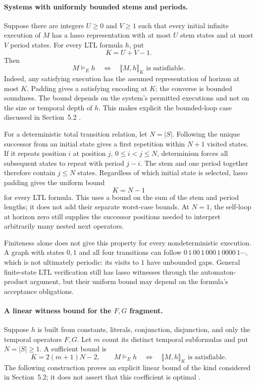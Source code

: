 \paragraph{Systems with uniformly bounded stems and periods.}
Suppose there are integers \(U\geq0\) and \(V\geq1\) such that
every initial infinite execution of \(M\) has a lasso
representation with at most \(U\) stem states and at most
\(V\) period states. For every LTL formula \(h\), put
\[
 K=U+V-1.
\]
Then
\[
 M\models_E h
 \quad\Longleftrightarrow\quad
 \llbracket M,h\rrbracket_K\text{ is satisfiable}.
\]
Indeed, any satisfying execution has the assumed representation
of horizon at most \(K\). Padding gives a satisfying encoding
at \(K\); the converse is bounded soundness. The bound depends
on the system's permitted executions and not on the size or
temporal depth of \(h\). This makes explicit the bounded-loop
case discussed in Section~5.2 \cite[\S5.2]{BiereCimattiClarkeZhu1999}.

For a deterministic total transition relation, let \(N=|S|\).
Following the unique successor from an initial state gives a
first repetition within \(N+1\) visited states. If it repeats
position \(i\) at position \(j\), \(0\leq i<j\leq N\),
determinism forces all subsequent states to repeat with
period \(j-i\). The stem and one period together therefore
contain \(j\leq N\) states. Regardless of which initial
state is selected, lasso padding gives the uniform bound
\[
 K=N-1
\]
for every LTL formula. This uses a bound on the sum of the
stem and period lengths; it does not add their separate
worst-case bounds. At \(N=1\), the self-loop at horizon
zero still supplies the successor positions needed to
interpret arbitrarily many nested next operators.

Finiteness alone does not give this property for every
nondeterministic execution. A graph with states \(0,1\)
and all four transitions can follow
\(0\,1\,00\,1\,000\,1\,0000\,1\cdots\), which is not
ultimately periodic: its visits to \(1\) have unbounded
gaps. General finite-state LTL verification still has
lasso witnesses through the automaton-product argument,
but their uniform bound may depend on the formula's
acceptance obligations.

\paragraph{A linear witness bound for the \(F,G\) fragment.}
Suppose \(h\) is built from constants, literals, conjunction,
disjunction, and only the temporal operators \(F,G\).
Let \(m\) count its distinct temporal subformulas and put
\(N=|S|\geq1\). A sufficient bound is
\[
 K=2(m+1)N-2,\qquad
 M\models_E h
 \quad\Longleftrightarrow\quad
 \llbracket M,h\rrbracket_K\text{ is satisfiable}.
\]
The following construction proves an explicit linear
bound of the kind considered in Section~5.2; it does
not assert that this coefficient is optimal
\cite[\S5.2]{BiereCimattiClarkeZhu1999}.

